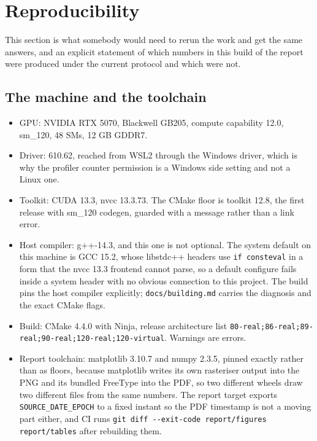 \section{Reproducibility}
\label{sec:repro}

This section is what somebody would need to rerun the work and get the same
answers, and an explicit statement of which numbers in this build of the report
were produced under the current protocol and which were not.

\subsection{The machine and the toolchain}

\begin{itemize}
\item GPU: NVIDIA RTX 5070, Blackwell GB205, compute capability 12.0, sm\_120, 48
      SMs, 12 GB GDDR7.
\item Driver: 610.62, reached from WSL2 through the Windows driver, which is why
      the profiler counter permission is a Windows side setting and not a Linux
      one.
\item Toolkit: CUDA 13.3, nvcc 13.3.73. The CMake floor is toolkit 12.8, the first
      release with sm\_120 codegen, guarded with a message rather than a link
      error.
\item Host compiler: g++-14.3, and this one is not optional. The system default on
      this machine is GCC 15.2, whose libstdc++ headers use \texttt{if consteval}
      in a form that the nvcc 13.3 frontend cannot parse, so a default configure
      fails inside a system header with no obvious connection to this project. The
      build pins the host compiler explicitly; \texttt{docs/building.md} carries the
      diagnosis and the exact CMake flags.
\item Build: CMake 4.4.0 with Ninja, release architecture list
      \texttt{80-real;86-real;89-real;90-real;120-real;120-virtual}. Warnings are
      errors.
\item Report toolchain: matplotlib 3.10.7 and numpy 2.3.5, pinned exactly rather
      than as floors, because matplotlib writes its own rasteriser output into the
      PNG and its bundled FreeType into the PDF, so two different wheels draw two
      different files from the same numbers. The report target exports
      \texttt{SOURCE\_DATE\_EPOCH} to a fixed instant so the PDF timestamp is not a
      moving part either, and CI runs
      \texttt{git diff -{}-exit-code report/figures report/tables} after rebuilding
      them.
\end{itemize}

